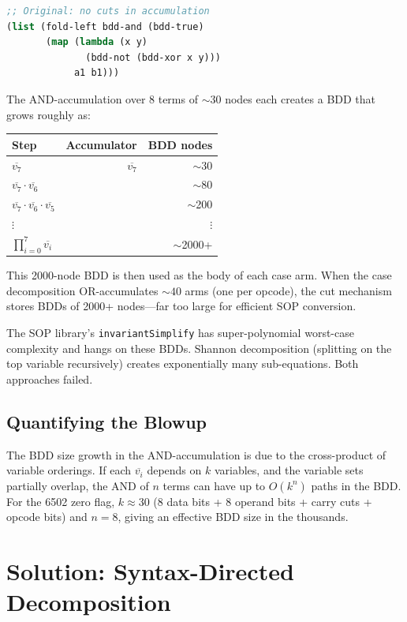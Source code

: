 \documentclass[11pt]{article}
\begin{document}
\begin{lstlisting}[language=Lisp]
;; Original: no cuts in accumulation
(list (fold-left bdd-and (bdd-true)
       (map (lambda (x y)
              (bdd-not (bdd-xor x y)))
            a1 b1)))
\end{lstlisting}

The AND-accumulation over 8 terms of ${\sim}30$ nodes each creates a
BDD that grows roughly as:

\begin{center}
\begin{tabular}{@{}lrr@{}}
\toprule
Step & Accumulator & BDD nodes \\
\midrule
$\overline{v_7}$ & $\overline{v_7}$ & $\sim$30 \\
$\overline{v_7} \cdot \overline{v_6}$ && $\sim$80 \\
$\overline{v_7} \cdot \overline{v_6} \cdot \overline{v_5}$ && $\sim$200 \\
$\vdots$ && $\vdots$ \\
$\prod_{i=0}^{7} \overline{v_i}$ && $\sim$2000+ \\
\bottomrule
\end{tabular}
\end{center}

This 2000-node BDD is then used as the body of each case arm.  When
the case decomposition OR-accumulates ${\sim}40$ arms (one per
opcode), the cut mechanism stores BDDs of 2000+ nodes---far too large
for efficient SOP conversion.

The SOP library's \texttt{invariantSimplify} has super-polynomial
worst-case complexity and hangs on these BDDs.  Shannon decomposition
(splitting on the top variable recursively) creates exponentially many
sub-equations.  Both approaches failed.

\subsection{Quantifying the Blowup}

The BDD size growth in the AND-accumulation is due to the cross-product
of variable orderings.  If each $\overline{v_i}$ depends on $k$
variables, and the variable sets partially overlap, the AND of $n$
terms can have up to $O(k^n)$ paths in the BDD.  For the 6502 zero
flag, $k \approx 30$ (8 data bits + 8 operand bits + carry cuts +
opcode bits) and $n = 8$, giving an effective BDD size in the
thousands.

\section{Solution: Syntax-Directed Decomposition}
\end{document}
